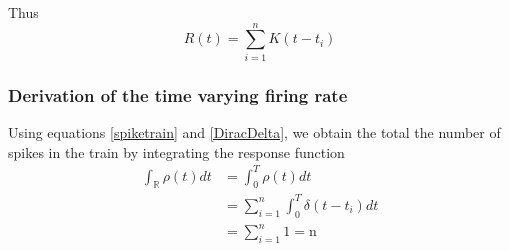Thus
\begin{equation} \label{firerate}
R(t) = \sum_{i=1}^{n} K(t-t_{i})
\end{equation}




%



\subsubsection{Derivation of the time varying firing rate}

Using equations \eqref{spiketrain} and \eqref{DiracDelta}, we obtain the total the number of spikes in the train by integrating the response function 
\begin{align*}
\int_{\mathbb{R}}  \rho(t)  dt &=   \int_{0}^{T}  \rho(t)  dt\\
      &= \displaystyle  \sum_{i=1}^{n}    \int_{0}^{T}  \delta(t-t_{i}) dt\\
              & = \displaystyle  \sum_{i=1}^{n} 1 = \text{n}
\end{align*}


